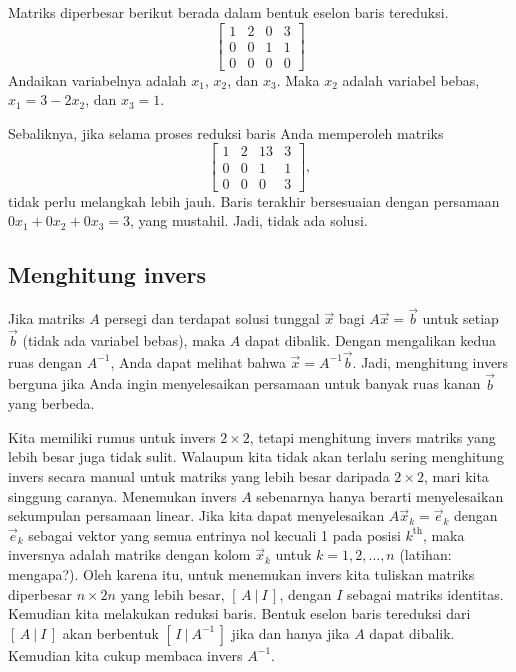 \begin{example}
Matriks diperbesar berikut berada dalam bentuk eselon baris tereduksi.
\begin{equation*}
\left[
\begin{array}{ccc|c}
1 & 2 & 0 & 3 \\
0 & 0 & 1 & 1 \\
0 & 0 & 0 & 0
\end{array}
\right]
\end{equation*}
Andaikan
variabelnya adalah $x_1$, $x_2$, dan $x_3$.  Maka $x_2$ adalah
variabel bebas, $x_1 = 3 - 2x_2$, dan $x_3 = 1$.

\medskip

Sebaliknya, jika selama proses reduksi baris Anda memperoleh
matriks
\begin{equation*}
\left[
\begin{array}{ccc|c}
1 & 2 & 13 & 3 \\
0 & 0 & 1 & 1 \\
0 & 0 & 0 & 3
\end{array}
\right]
,
\end{equation*}
tidak perlu melangkah lebih jauh.  Baris terakhir bersesuaian dengan
persamaan $0 x_1 + 0 x_2 + 0 x_3 = 3$, yang mustahil.  Jadi,
tidak ada solusi.
\end{example}

\subsection{Menghitung invers}

Jika matriks $A$ persegi dan terdapat solusi tunggal
$\vec{x}$ bagi $A \vec{x} = \vec{b}$ untuk setiap $\vec{b}$ (tidak ada variabel
bebas), maka $A$ dapat dibalik.
Dengan mengalikan kedua ruas dengan $A^{-1}$, Anda dapat melihat bahwa $\vec{x} =
A^{-1} \vec{b}$.  Jadi, menghitung invers berguna jika Anda ingin
menyelesaikan persamaan untuk banyak ruas kanan $\vec{b}$ yang berbeda.

Kita memiliki rumus untuk
invers $2 \times 2$, tetapi menghitung invers
matriks yang lebih besar juga tidak sulit.
Walaupun kita tidak akan terlalu sering menghitung invers secara manual untuk matriks
yang lebih besar daripada $2 \times 2$, mari kita singgung caranya.
Menemukan invers $A$ sebenarnya hanya berarti menyelesaikan sekumpulan persamaan
linear.  Jika kita dapat menyelesaikan $A \vec{x}_k = \vec{e}_k$ dengan $\vec{e}_k$
sebagai vektor yang semua entrinya nol kecuali 1 pada posisi $k^{\text{th}}$, maka
inversnya adalah matriks dengan kolom $\vec{x}_k$ untuk $k=1,2,\ldots,n$
(latihan: mengapa?).  Oleh karena itu, untuk menemukan invers kita tuliskan matriks diperbesar
$n \times 2n$ yang lebih besar, $[ \,A ~|~ I\, ]$, dengan $I$ sebagai matriks
identitas.
Kemudian kita melakukan reduksi baris.
Bentuk eselon baris tereduksi dari $[ \,A ~|~ I\, ]$
akan berbentuk $[ \,I ~|~ A^{-1}\, ]$ jika dan hanya jika
$A$ dapat dibalik.  Kemudian kita cukup membaca invers $A^{-1}$.

